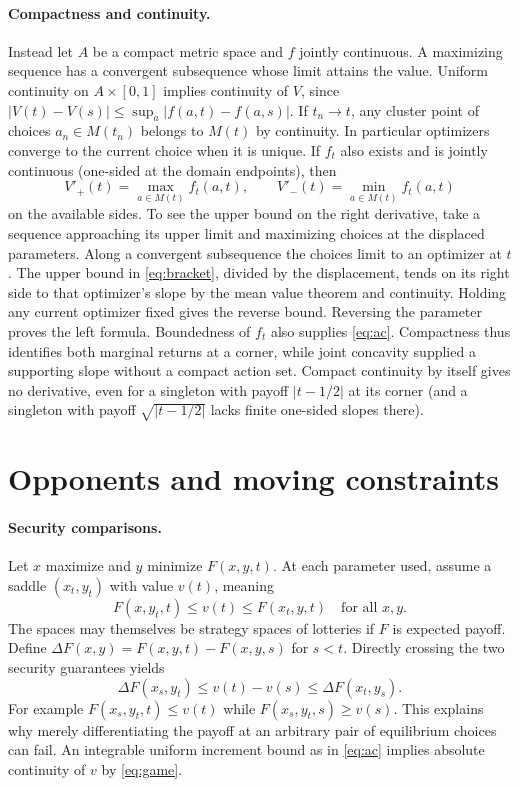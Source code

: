 \documentclass[11pt]{article}
\begin{document}
\paragraph{Compactness and continuity.}
Instead let $A$ be a compact metric space and $f$ jointly continuous. A maximizing sequence has a convergent subsequence whose limit attains the value. Uniform continuity on $A\times[0,1]$ implies continuity of $V$, since $|V(t)-V(s)|\le\sup_a|f(a,t)-f(a,s)|$. If $t_n\to t$, any cluster point of choices $a_n\in M(t_n)$ belongs to $M(t)$ by continuity. In particular optimizers converge to the current choice when it is unique. If $f_t$ also exists and is jointly continuous (one-sided at the domain endpoints), then
\begin{equation}\label{eq:compact}
 V'_+(t)=\max_{a\in M(t)} f_t(a,t),\qquad
 V'_-(t)=\min_{a\in M(t)} f_t(a,t)
\end{equation}
on the available sides. To see the upper bound on the right derivative, take a sequence approaching its upper limit and maximizing choices at the displaced parameters. Along a convergent subsequence the choices limit to an optimizer at $t$. The upper bound in \eqref{eq:bracket}, divided by the displacement, tends on its right side to that optimizer's slope by the mean value theorem and continuity. Holding any current optimizer fixed gives the reverse bound. Reversing the parameter proves the left formula. Boundedness of $f_t$ also supplies \eqref{eq:ac}. Compactness thus identifies both marginal returns at a corner, while joint concavity supplied a supporting slope without a compact action set. Compact continuity by itself gives no derivative, even for a singleton with payoff $|t-1/2|$ at its corner (and a singleton with payoff $\sqrt{|t-1/2|}$ lacks finite one-sided slopes there).

\section{Opponents and moving constraints}\label{sec:games}

\paragraph{Security comparisons.}
Let $x$ maximize and $y$ minimize $F(x,y,t)$. At each parameter used, assume a saddle $(x_t,y_t)$ with value $v(t)$, meaning
\[
 F(x,y_t,t)\le v(t)\le F(x_t,y,t)\quad\text{for all }x,y.
\]
The spaces may themselves be strategy spaces of lotteries if $F$ is expected payoff. Define $\Delta F(x,y)=F(x,y,t)-F(x,y,s)$ for $s<t$. Directly crossing the two security guarantees yields
\begin{equation}\label{eq:game}
 \Delta F(x_s,y_t)\le v(t)-v(s)\le \Delta F(x_t,y_s).
\end{equation}
For example $F(x_s,y_t,t)\le v(t)$ while $F(x_s,y_t,s)\ge v(s)$. This explains why merely differentiating the payoff at an arbitrary pair of equilibrium choices can fail. An integrable uniform increment bound as in \eqref{eq:ac} implies absolute continuity of $v$ by \eqref{eq:game}.
\end{document}
